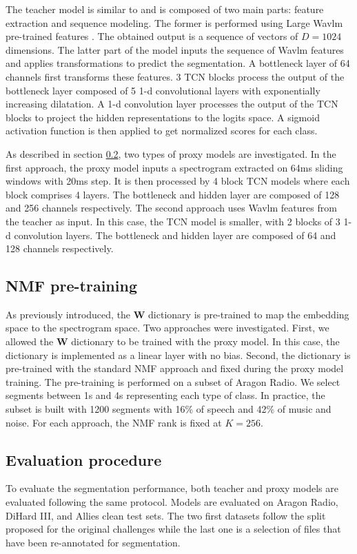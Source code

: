 The teacher model is similar to \cite{lebourdais22_interspeech} and is composed of two main parts: feature extraction and sequence modeling.
The former is performed using Large Wavlm pre-trained features \cite{chen2022wavlm}.
The obtained output is a sequence of vectors of $D=1024$ dimensions.
The latter part of the model inputs the sequence of Wavlm features and applies transformations to predict the segmentation.
A bottleneck layer of 64 channels first transforms these features.
3 TCN blocks process the output of the bottleneck layer \cite{bai_empirical_2018} composed of 5 1-d convolutional layers with exponentially increasing dilatation. 
A 1-d convolution layer processes the output of the TCN blocks to project the hidden representations to the logits space.
A sigmoid activation function is then applied to get normalized scores for each class.

As described in section \ref{}, two types of proxy models are investigated.
In the first approach, the proxy model inputs a spectrogram extracted on 64ms sliding windows with 20ms step.
It is then processed by 4 block TCN models where each block comprises 4 layers.
The bottleneck and hidden layer are composed of 128 and 256 channels respectively.
The second approach uses Wavlm features from the teacher as input.
In this case, the TCN model is smaller, with 2 blocks of 3 1-d convolution layers. 
The bottleneck and hidden layer are composed of 64 and 128 channels respectively.

\subsection{NMF pre-training}

As previously introduced, the $\mathbf{W}$ dictionary is pre-trained to map the embedding space to the spectrogram space.
Two approaches were investigated.
First, we allowed the $\mathbf{W}$ dictionary to be trained with the proxy model.
In this case, the dictionary is implemented as a linear layer with no bias.
Second, the dictionary is pre-trained with the standard NMF approach and fixed during the proxy model training.
The pre-training is performed on a subset of Aragon Radio.
We select segments between 1s and 4s representing each type of class.
In practice, the subset is built with 1200 segments with 16\% of speech and 42\% of music and noise.
For each approach, the NMF rank is fixed at $K=256$.


\subsection{Evaluation procedure}

To evaluate the segmentation performance, both teacher and proxy models are evaluated following the same protocol.
Models are evaluated on Aragon Radio, DiHard III, and Allies clean test sets.
The two first datasets follow the split proposed for the original challenges \cite{albayzin12,ryant2021dihard} while the last one is a selection of files that have been re-annotated for segmentation.

